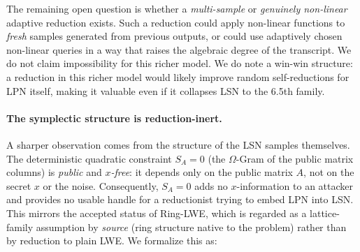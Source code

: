 \documentclass[11pt,a4paper]{article}
\theoremstyle{plain}
\theoremstyle{definition}
\begin{document}
The remaining open question is whether a \emph{multi-sample} or \emph{genuinely non-linear} adaptive reduction exists. Such a reduction could apply non-linear functions to \emph{fresh} samples generated from previous outputs, or could use adaptively chosen non-linear queries in a way that raises the algebraic degree of the transcript. We do not claim impossibility for this richer model. We do note a win-win structure: a reduction in this richer model would likely improve random self-reductions for LPN itself, making it valuable even if it collapses LSN to the 6.5th family.

\paragraph{The symplectic structure is reduction-inert.}
A sharper observation comes from the structure of the LSN samples themselves. The deterministic quadratic constraint $S_A = 0$ (the $\Omega$-Gram of the public matrix columns) is \emph{public} and \emph{$x$-free}: it depends only on the public matrix $A$, not on the secret $x$ or the noise. Consequently, $S_A=0$ adds no $x$-information to an attacker and provides no usable handle for a reductionist trying to embed LPN into LSN. This mirrors the accepted status of Ring-LWE, which is regarded as a lattice-family assumption by \emph{source} (ring structure native to the problem) rather than by reduction to plain LWE. We formalize this as:
\end{document}
